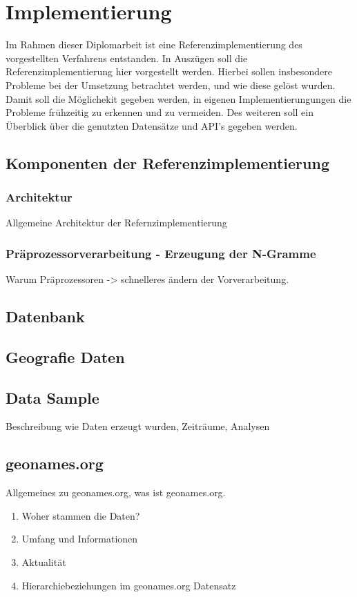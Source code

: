 \chapter{Implementierung} 
Im Rahmen dieser Diplomarbeit ist eine Referenzimplementierung des vorgestellten Verfahrens entstanden.
In Auszügen soll die Referenzimplementierung hier vorgestellt werden. 
Hierbei sollen insbesondere Probleme bei der Umsetzung betrachtet werden, und wie diese gelöst wurden. 
Damit soll die Möglichekit gegeben werden, in eigenen Implementierungungen die Probleme frühzeitig zu erkennen und zu vermeiden. 
Des weiteren soll ein Überblick über die genutzten Datensätze und API's gegeben werden.  

\section{Komponenten der Referenzimplementierung}

	\subsection{Architektur}
	Allgemeine Architektur der Refernzimplementierung 

	\subsection{Präprozessorverarbeitung - Erzeugung der N-Gramme}
	Warum Präprozessoren -> schnelleres ändern der Vorverarbeitung.



\section{Datenbank}

\subsection{}




\section{Geografie Daten}  

\section{Data Sample}
	Beschreibung wie Daten erzeugt wurden, Zeiträume, Analysen

\section{geonames.org}	
Allgemeines zu geonames.org, was ist geonames.org. 
			\begin{enumerate}
				\item Woher stammen die Daten?
				\item Umfang und Informationen
				\item Aktualität
				\item Hierarchiebeziehungen im geonames.org Datensatz
			\end{enumerate}	